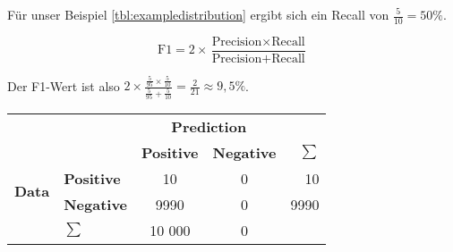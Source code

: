 Für unser Beispiel \cref{tbl:exampledistribution}
ergibt sich ein Recall von \(\frac{5}{10} = 50\% \).

\begin{defn}
	\begin{equation}
		\label{eqn:f1}
		\text{F1}
		= 2 \times \frac{\text{Precision}\times\text{Recall}}{\text{Precision}+\text{Recall}}
	\end{equation}
\end{defn}

Der F1-Wert ist also
\(2 \times \frac{\frac{5}{95}\times\frac{5}{10}}{\frac{5}{95}+\frac{5}{10}}=\frac{2}{21} \approx 9,5\%\).


\nocite{overleaf:HowToThesisPart3}
\begin{table}
	\begin{subtable}{0.45\textwidth}
		\begin{center}
			\begin{tabularx}{\textwidth}{l l | c c | r}
				                               &                   & \multicolumn{2}{c|}{\textbf{Prediction}} &                            \\
				                               &                   & \textbf{Positive}                        & \textbf{Negative} & $\sum$ \\
				\cline{1-5}
				\multirow{2}{*}{\textbf{Data}} & \textbf{Positive} & 10                                       & 0                 & 10     \\
				                               & \textbf{Negative} & 9990                                     & 0                 & 9990   \\
				\cline{1-5}
				                               & $\sum$            & 10 000                                   & 0                 &
			\end{tabularx}
		\end{center}


\end{subtable}
\end{table}
